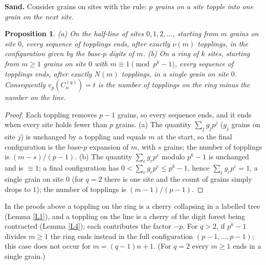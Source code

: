 \documentclass[11pt]{article}
\newtheorem{proposition}{Proposition}
\theoremstyle{remark}
\newcommand{\C}{C_n^{(q)}}
\begin{document}
\textbf{Sand.} Consider grains on sites with the rule: \emph{$p$ grains on a site topple into
one grain on the next site.}
\begin{proposition}
\textup{(a)} On the half-line of sites $0,1,2,\dots$, starting from $m$ grains on site $0$, every
sequence of topplings ends, after exactly $\nu(m)$ topplings, in the configuration given by
the base-$p$ digits of $m$.
\textup{(b)} On a ring of $k$ sites, starting from $m\ge1$ grains on site $0$ with
$m\equiv1\pmod{p^k-1}$, every sequence of topplings ends, after exactly $N(m)$ topplings, in
a single grain on site $0$.
Consequently $v_p(\C)=t$ is the number of topplings on the ring minus the number on the line.
\end{proposition}
\begin{proof}
Each toppling removes $p-1$ grains, so every sequence ends, and it ends when every site holds
fewer than $p$ grains. (a) The quantity $\sum_jg_jp^j$ ($g_j$ grains on site $j$) is unchanged
by a toppling and equals $m$ at the start, so the final configuration is the base-$p$
expansion of $m$, with $s$ grains; the number of topplings is $(m-s)/(p-1)$. (b) The quantity
$\sum_cg_cp^c$ modulo $p^k-1$ is unchanged and is $\equiv1$; a final configuration has
$0<\sum_cg_cp^c\le p^k-1$, hence $\sum_cg_cp^c=1$, a single grain on site $0$ (for $q=2$ there
is one site and the count of grains simply drops to $1$); the number of topplings is
$(m-1)/(p-1)$.
\end{proof}
In the proofs above a toppling on the ring is a cherry collapsing in a labelled tree (Lemma
\ref{L1}), and a toppling on the line is a cherry of the digit forest being contracted (Lemma
\ref{L4}); each contributes the factor $-p$. For $q>2$, if $p^k-1$ divides $m\ge1$ the
ring ends instead in the full configuration $(p-1,\dots,p-1)$; this case does not occur for
$m=(q-1)n+1$. (For $q=2$ every $m\ge1$ ends in a single grain.)
\end{document}
